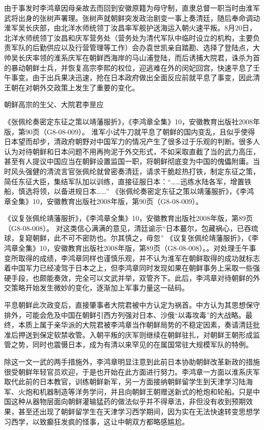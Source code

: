 \documentclass[12pt,UTF8]{ctexbook}
\begin{document}
由于事发时李鸿章因母亲故去而回到安徽原籍为母守制，直隶总督一职当时由淮军武将出身的张树声署理。张树声就朝鲜突发政治剧变一事上奏清廷，随后奉命调动淮军吴长庆部，由北洋水师统领丁汝昌率军舰护送海运入朝火速平叛。8月20日，北洋水师统领丁汝昌和庆军营务处（营务处为清代军队中临时设立的机构，主要负责军队的后勤供应以及行营管理等工作）会办袁世凯亲自踏勘、选择了登陆点，大帅吴长庆率领的淮系庆军在朝鲜西海岸的马山浦登陆，而后诱捕大院君，诛杀为首的暴动朝鲜士兵，并恢复高宗李熙的权位，迎逃难在外的闵妃回宫，快速平息了壬午事变。由于出兵果决迅速，抢在日本政府做出全面反应前就平息了事变，因此清王朝在对朝外交政策上发生了重要的变化。


朝鲜高宗的生父、大院君李昰应

《张佩纶奏密定东征之策以靖藩服折》，《李鸿章全集》10，安徽教育出版社2008年版，第90页（G8-08-009）。
淮军小试牛刀就平息了朝鲜的国内变乱，且似乎使得日本望而却步，清政府朝野对中国军力的情况产生了很多过于乐观的判断。很多人认为对待朝鲜和日本问题不用再拘泥于外交形式，不如采取直截了当的武力高压，甚至有人提议中国应当在朝鲜设置监国一职，将朝鲜彻底变为中国的傀儡附庸。当时风头强健的清流言官张佩纶就曾密奏清廷，请求干脆趁热打铁，制定东征之策，简任东征大臣，集结军队加以训练，直接征服日本：“……迅练水陆各军，增置铁船，慎选将领，以备进规日本……” 《张佩纶奏密定东征之策以靖藩服折》，《李鸿章全集》10，安徽教育出版社2008年版，第90页（G8-08-009）。

《议复张佩纶靖藩服折》，《李鸿章全集》10，安徽教育出版社2008年版，第89页（G8-08-008）。
对这类信心满满的意见，清廷谕示“日本蕞尔，包藏祸心，已吞琉球，复窥朝鲜，此不可不密防也。尔其慎之，毋忽” 《议复张佩纶靖藩服折》，《李鸿章全集》10，安徽教育出版社2008年版，第89页（G8-08-008）。。对处理壬午事变所取得的成绩，李鸿章同样也谨慎乐观，并不认为淮军在朝鲜取得的成功就标志着中国军力已经凌驾于日本之上，但李鸿章同时发现如果在朝鲜事务上采取一些强硬手段，也颇能奏效，完全可以文武并举，双管齐下。此后，李鸿章对待朝鲜的外交策略开始发生微妙的变化，逐渐加上军事力量这一砝码。

平息朝鲜此次政变后，直接肇事者大院君被中方认定为祸首。中方认为其思想保守排外，可能会危及中国在朝鲜引西方列强对日本、沙俄“以毒攻毒”的大战略。最终，本质上属于亲华派的大院君被李鸿章当作朝鲜局势的不稳定因素，奏请清廷批准后押送到保定软禁收管。入朝平叛的庆军则继续在朝鲜驻扎，对朝鲜王朝形成监管之势，同时也震慑日本，成为有清以来罕见的在属国常驻大规模军队的特例。

除这一文一武的两手措施外，李鸿章明显注意到此前日本协助朝鲜改革新政的措施很受朝鲜年轻官员欢迎，于是也开始在此方面进行努力。李鸿章一方面以淮系庆军取代此前的日本教官，训练朝鲜新军，另一方面接纳朝鲜留学生到天津学习陆海军、火炮和机器制造等洋务学问，并且向朝鲜王朝赠送新式的枪炮和轮船。只是中国这种从器物层面向朝鲜灌输猛药的做法似乎并不得章法，非但没有收到预期效果，甚至还出现了朝鲜留学生在天津学习西学期间，因为实在无法快速转变思想学习西学，以致癫狂发疯的怪事，这让中朝双方都略感尴尬。
\end{document}
